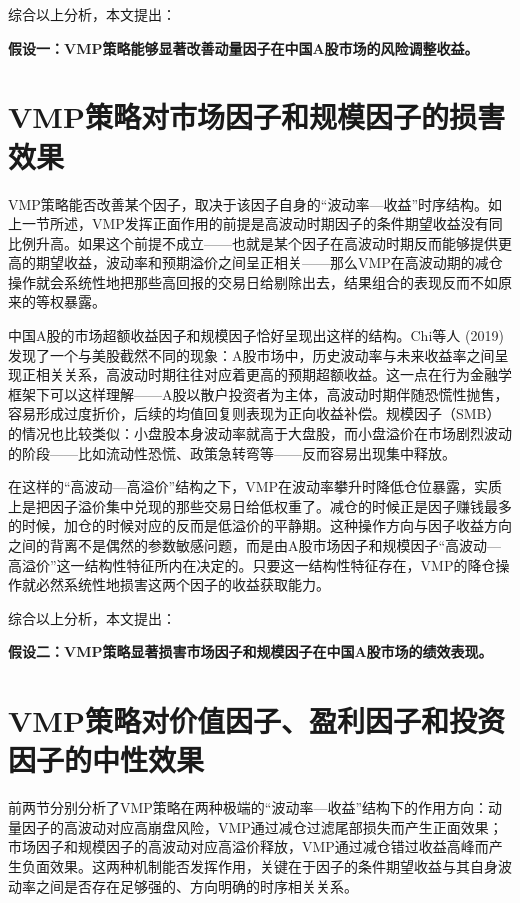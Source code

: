\documentclass[
    decl-page,
    oneside,
  ]{njuthesis}
\begin{document}
综合以上分析，本文提出：

\textbf{假设一：VMP策略能够显著改善动量因子在中国A股市场的风险调整收益。}

\section{VMP策略对市场因子和规模因子的损害效果}

VMP策略能否改善某个因子，取决于该因子自身的“波动率—收益”时序结构。如上一节所述，VMP发挥正面作用的前提是高波动时期因子的条件期望收益没有同比例升高。如果这个前提不成立——也就是某个因子在高波动时期反而能够提供更高的期望收益，波动率和预期溢价之间呈正相关——那么VMP在高波动期的减仓操作就会系统性地把那些高回报的交易日给剔除出去，结果组合的表现反而不如原来的等权暴露。

中国A股的市场超额收益因子和规模因子恰好呈现出这样的结构。Chi等人 (2019) 发现了一个与美股截然不同的现象：A股市场中，历史波动率与未来收益率之间呈现正相关关系，高波动时期往往对应着更高的预期超额收益。这一点在行为金融学框架下可以这样理解——A股以散户投资者为主体，高波动时期伴随恐慌性抛售，容易形成过度折价，后续的均值回复则表现为正向收益补偿。规模因子（SMB）的情况也比较类似：小盘股本身波动率就高于大盘股，而小盘溢价在市场剧烈波动的阶段——比如流动性恐慌、政策急转弯等——反而容易出现集中释放。

在这样的“高波动—高溢价”结构之下，VMP在波动率攀升时降低仓位暴露，实质上是把因子溢价集中兑现的那些交易日给低权重了。减仓的时候正是因子赚钱最多的时候，加仓的时候对应的反而是低溢价的平静期。这种操作方向与因子收益方向之间的背离不是偶然的参数敏感问题，而是由A股市场因子和规模因子“高波动—高溢价”这一结构性特征所内在决定的。只要这一结构性特征存在，VMP的降仓操作就必然系统性地损害这两个因子的收益获取能力。

综合以上分析，本文提出：

\textbf{假设二：VMP策略显著损害市场因子和规模因子在中国A股市场的绩效表现。}

\section{VMP策略对价值因子、盈利因子和投资因子的中性效果}

前两节分别分析了VMP策略在两种极端的“波动率—收益”结构下的作用方向：动量因子的高波动对应高崩盘风险，VMP通过减仓过滤尾部损失而产生正面效果；市场因子和规模因子的高波动对应高溢价释放，VMP通过减仓错过收益高峰而产生负面效果。这两种机制能否发挥作用，关键在于因子的条件期望收益与其自身波动率之间是否存在足够强的、方向明确的时序相关关系。
\end{document}
